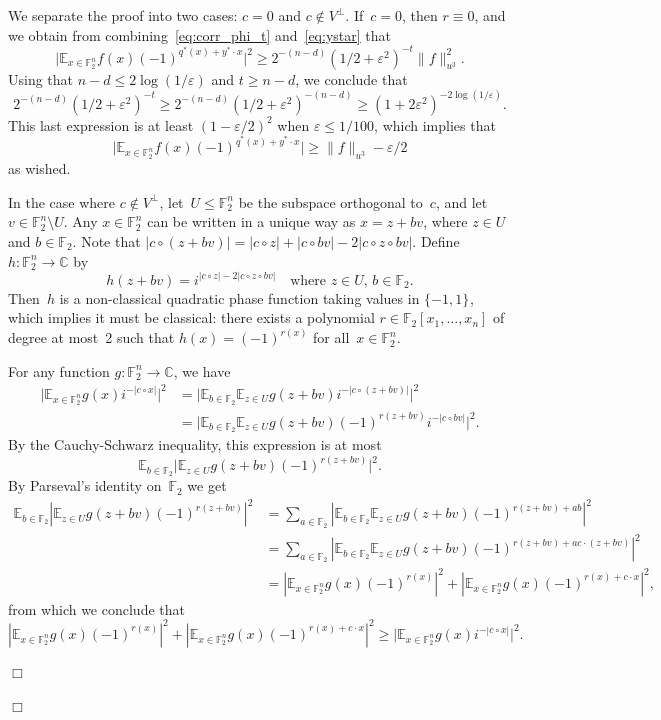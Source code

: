 \documentclass[11pt]{amsart}
\newcommand{\E}{\mathbb{E}}
\newcommand{\C}{\mathbb{C}} %
\newcommand{\F}{\mathbb{F}} %
\newcommand{\pmset}[1]{\{-1,1\}^{#1}} %
\newcommand{\eps}{\varepsilon}
\theoremstyle{plain}
\theoremstyle{definition}
\theoremstyle{remark}
\renewenvironment{proof}[1][]{
    	\begin{trivlist}
     	\item[\hspace{\labelsep}{\em\noindent Proof#1:\/}]}
     	{{\hfill$\Box$}
    	\end{trivlist}
  }
\begin{document}
\begin{proof}[ of \cref{thm:quadratic_GL}]
\begin{proof}
We separate the proof into two cases:
$c=0$ and $c\notin V^{\perp}$.
If~$c=0$, then $r\equiv 0$, and we obtain from combining~\eqref{eq:corr_phi_t} and~\eqref{eq:ystar} that
$$\big|\E_{x\in \F_2^n} f(x) (-1)^{q^*(x) + y^* \cdot x}\big|^2 \geq 2^{-(n-d)} (1/2+\eps^2)^{-t} \|f\|_{u^3}^2.$$
Using that $n-d \leq 2\log(1/\eps)$ and $t\geq n-d$, we conclude that
$$2^{-(n-d)} (1/2+\eps^2)^{-t} \geq 2^{-(n-d)} (1/2+\eps^2)^{-(n-d)} \geq (1+2\eps^2)^{-2\log(1/\eps)}.$$
This last expression is at least $(1-\eps/2)^2$ when $\eps \leq 1/100$, which implies that
$$\big|\E_{x\in \F_2^n} f(x) (-1)^{q^*(x) + y^* \cdot x}\big| \geq \|f\|_{u^3} - \eps/2$$
as wished.

In the case where $c\notin V^{\perp}$, let~$U \leq \F_2^n$ be the subspace orthogonal to~$c$, and let~$v \in \F_2^n\setminus U$.
Any $x\in \F_2^n$ can be written in a unique way as $x = z+bv$, where $z\in U$ and $b\in \F_2$.
Note that $|c\circ (z+bv)| = |c\circ z| + |c\circ bv| - 2|c\circ z\circ bv|$.
Define $h:\F_2^n\to \C$ by
$$h(z+bv) = i^{|c\circ z|  - 2|c\circ z\circ bv|} \quad \text{where $z\in U$, $b\in \F_2$.}$$
Then~$h$ is a non-classical quadratic phase function taking values in $\pmset{}$, which implies it must be classical:
there exists a polynomial $r\in \F_2[x_1,\dots,x_n]$ of degree at most~2 such that $h(x) = (-1)^{r(x)}$ for all~$x\in \F_2^n$.

For any function $g: \F_2^n \to \C$, we have
\begin{align*}
    \big|\E_{x\in \F_2^n} g(x) i^{-|c\circ x|}\big|^2
    &= \big|\E_{b\in \F_2} \E_{z\in U} g(z+bv) i^{-|c\circ (z+bv)|} \big|^2 \\
    &= \big|\E_{b\in \F_2} \E_{z\in U} g(z+bv) (-1)^{r(z+bv)} i^{-|c\circ bv|} \big|^2.
\end{align*}
By the Cauchy-Schwarz inequality, this expression is at most
\begin{equation*}
    \E_{b\in \F_2}\big|\E_{z\in U} g(z+bv)(-1)^{r(z+bv)}\big|^2.
\end{equation*}
By Parseval's identity on~$\F_2$ we get
\begin{align*}
    \E_{b\in \F_2} |\E_{z\in U} g(z+bv) (-1)^{r(z+bv)}|^2
    &= \sum_{a\in \F_2} |\E_{b\in \F_2} \E_{z\in U} g(z+bv) (-1)^{r(z+bv) + ab}|^2 \\
    &= \sum_{a\in \F_2} |\E_{b\in \F_2} \E_{z\in U} g(z+bv) (-1)^{r(z+bv) + a c\cdot (z+bv)}|^2 \\
    &= |\E_{x\in \F_2^n} g(x)(-1)^{r(x)}|^2 + |\E_{x\in \F_2^n} g(x) (-1)^{r(x) + c\cdot x}|^2,
\end{align*}
from which we conclude that
$$|\E_{x\in \F_2^n} g(x)(-1)^{r(x)}|^2 + |\E_{x\in \F_2^n} g(x) (-1)^{r(x) + c\cdot x}|^2 \geq \big|\E_{x\in \F_2^n} g(x) i^{-|c\circ x|}\big|^2.$$


\end{proof}
\end{proof}
\end{document}
